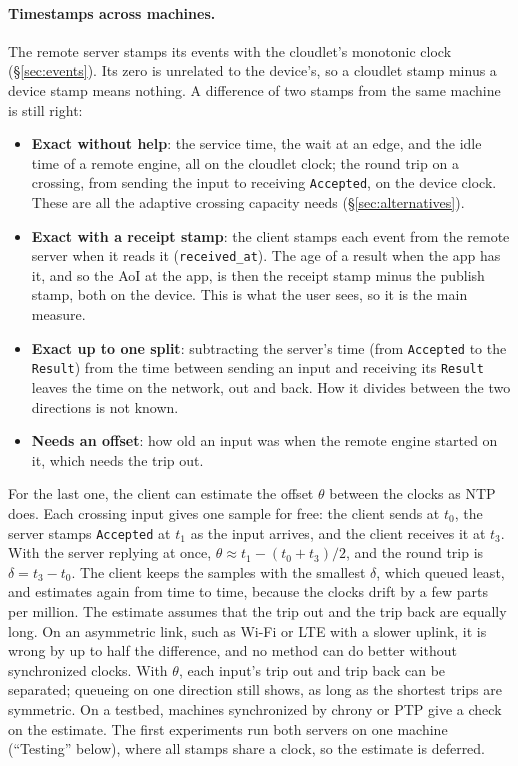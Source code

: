 \documentclass[11pt]{article}
\newcommand{\code}[1]{\texttt{#1}}
\begin{document}
\paragraph{Timestamps across machines.} The remote server stamps its events
with the cloudlet's monotonic clock (\S\ref{sec:events}). Its zero is
unrelated to the device's, so a cloudlet stamp minus a device stamp means
nothing. A difference of two stamps from the same machine is still right:
\begin{itemize}[nosep]
  \item \textbf{Exact without help}: the service time, the wait at an edge,
        and the idle time of a remote engine, all on the cloudlet clock; the
        round trip on a crossing, from sending the input to receiving
        \code{Accepted}, on the device clock. These are all the adaptive
        crossing capacity needs (\S\ref{sec:alternatives}).
  \item \textbf{Exact with a receipt stamp}: the client stamps each event
        from the remote server when it reads it (\code{received\_at}). The
        age of a result when the app has it, and so the AoI at the app, is
        then the receipt stamp minus the publish stamp, both on the device.
        This is what the user sees, so it is the main measure.
  \item \textbf{Exact up to one split}: subtracting the server's time
        (from \code{Accepted} to the \code{Result}) from the time between
        sending an input and receiving its \code{Result} leaves the time on
        the network, out and back. How it divides between the two directions
        is not known.
  \item \textbf{Needs an offset}: how old an input was when the remote
        engine started on it, which needs the trip out.
\end{itemize}
For the last one, the client can estimate the offset $\theta$ between the
clocks as NTP does. Each crossing input gives one sample for free: the client
sends at $t_0$, the server stamps \code{Accepted} at $t_1$ as the input
arrives, and the client receives it at $t_3$. With the server replying at
once, $\theta \approx t_1 - (t_0 + t_3)/2$, and the round trip is
$\delta = t_3 - t_0$. The client keeps the samples with the smallest
$\delta$, which queued least, and estimates again from time to time, because
the clocks drift by a few parts per million. The estimate assumes that the
trip out and the trip back are equally long. On an asymmetric link, such as
Wi-Fi or LTE with a slower uplink, it is wrong by up to half the difference,
and no method can do better without synchronized clocks. With $\theta$, each
input's trip out and trip back can be separated; queueing on one direction
still shows, as long as the shortest trips are symmetric. On a testbed,
machines synchronized by chrony or PTP give a check on the estimate. The
first experiments run both servers on one machine (``Testing'' below), where
all stamps share a clock, so the estimate is deferred.
\end{document}
